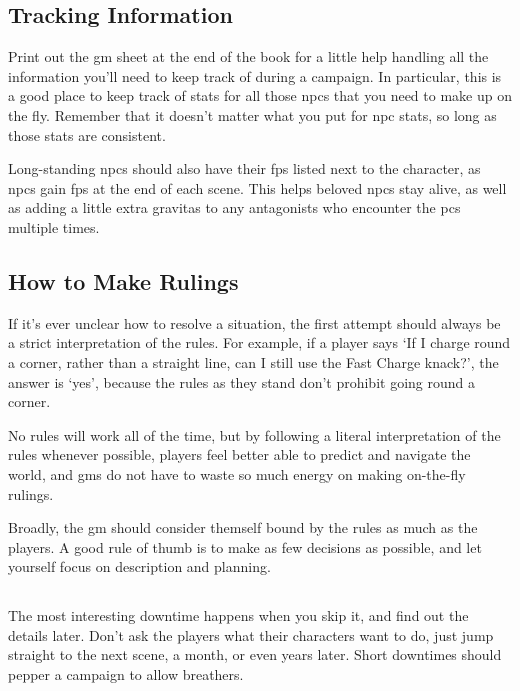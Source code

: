 \begin{multicols}{2}
\subsection{Tracking Information}

Print out the \gls{gm} sheet at the end of the book for a little help handling all the information you'll need to keep track of during a campaign.
In particular, this is a good place to keep track of stats for all those \glspl{npc} that you need to make up on the fly.
Remember that it doesn't matter what you put for \gls{npc} stats, so long as those stats are consistent.

Long-standing \glspl{npc} should also have their \glspl{fp} listed next to the character, as \glspl{npc} gain \glspl{fp} at the end of each scene.
This helps beloved \glspl{npc} stay alive, as well as adding a little extra gravitas to any antagonists who encounter the \glspl{pc} multiple times.

\subsection{How to Make Rulings}

If it's ever unclear how to resolve a situation, the first attempt should always be a strict interpretation of the rules.
For example, if a player says `If I charge round a corner, rather than a straight line, can I still use the Fast Charge knack?', the answer is `yes', because the rules as they stand don't prohibit going round a corner.

No rules will work all of the time, but by following a literal interpretation of the rules whenever possible, players feel better able to predict and navigate the world, and \glspl{gm} do not have to waste so much energy on making on-the-fly rulings.

Broadly, the \gls{gm} should consider themself bound by the rules as much as the players.
A good rule of thumb is to make as few decisions as possible, and let yourself focus on description and planning.

\subsection{}

The most interesting \gls{downtime} happens when you skip it, and find out the details later.
Don't ask the players what their characters want to do, just jump straight to the next scene, a month, or even years later.
Short \glspl{downtime} should pepper a campaign to allow breathers.


\end{multicols}
